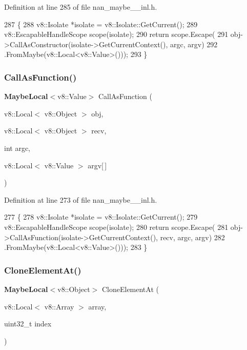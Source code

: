 Definition at line 285 of file nan\+\_\+maybe\+\_\+\_\+inl.\+h.


\begin{DoxyCode}
287                                        \{
288   v8::Isolate *isolate = v8::Isolate::GetCurrent();
289   v8::EscapableHandleScope scope(isolate);
290   \textcolor{keywordflow}{return} scope.Escape(
291       obj->CallAsConstructor(isolate->GetCurrentContext(), argc, argv)
292           .FromMaybe(v8::Local<v8::Value>()));
293 \}
\end{DoxyCode}
\mbox{\label{nan__maybe__43__inl_8h_af72b862e9971303bb5e4edce9fa7cb13}} 
\subsubsection{Call\+As\+Function()}
{\footnotesize\ttfamily \textbf{ Maybe\+Local}$<$v8\+::\+Value$>$ Call\+As\+Function (\begin{DoxyParamCaption}\item[{v8\+::\+Local$<$ v8\+::\+Object $>$}]{obj,  }\item[{v8\+::\+Local$<$ v8\+::\+Object $>$}]{recv,  }\item[{int}]{argc,  }\item[{v8\+::\+Local$<$ v8\+::\+Value $>$}]{argv[$\,$] }\end{DoxyParamCaption})}



Definition at line 273 of file nan\+\_\+maybe\+\_\+\_\+inl.\+h.


\begin{DoxyCode}
277                              \{
278   v8::Isolate *isolate = v8::Isolate::GetCurrent();
279   v8::EscapableHandleScope scope(isolate);
280   \textcolor{keywordflow}{return} scope.Escape(
281       obj->CallAsFunction(isolate->GetCurrentContext(), recv, argc, argv)
282           .FromMaybe(v8::Local<v8::Value>()));
283 \}
\end{DoxyCode}
\mbox{\label{nan__maybe__43__inl_8h_a9e97be747ead66bdebed12ce8571b72c}} 
\subsubsection{Clone\+Element\+At()}
{\footnotesize\ttfamily \textbf{ Maybe\+Local}$<$v8\+::\+Object$>$ Clone\+Element\+At (\begin{DoxyParamCaption}\item[{v8\+::\+Local$<$ v8\+::\+Array $>$}]{array,  }\item[{uint32\+\_\+t}]{index }\end{DoxyParamCaption})}



